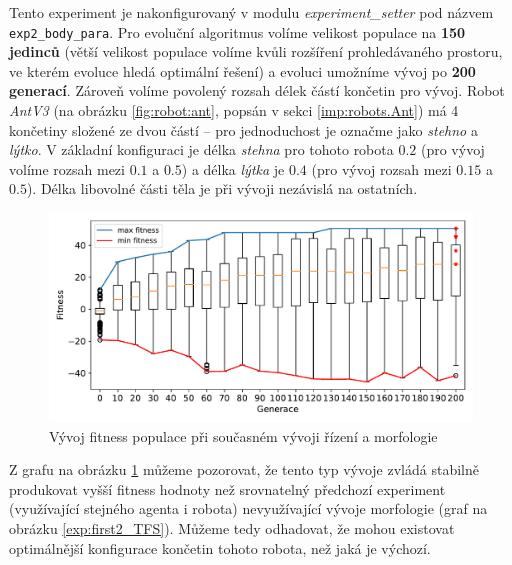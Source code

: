 Tento experiment je nakonfigurovaný v modulu \emph{experiment\_setter} pod
názvem \texttt{exp2\_body\_para}. Pro evoluční algoritmus volíme velikost
populace na \textbf{150 jedinců} (větší velikost populace volíme kvůli
rozšíření prohledávaného prostoru, ve kterém evoluce hledá optimální řešení) a
evoluci umožníme vývoj po \textbf{200 generací}. Zároveň volíme povolený rozsah
délek částí končetin pro vývoj. Robot \emph{AntV3} (na obrázku
\ref{fig:robot:ant}, popsán v sekci \ref{imp:robots.Ant}) má 4 končetiny
složené ze dvou částí -- pro jednoduchost je označme jako \emph{stehno} a
\emph{lýtko}. V základní konfiguraci je délka \emph{stehna} pro tohoto robota
$0.2$ (pro vývoj volíme rozsah mezi $0.1$ a $0.5$) a délka \emph{lýtka} je
$0.4$ (pro vývoj rozsah mezi $0.15$ a $0.5$). Délka libovolné části těla je při
vývoji nezávislá na ostatních.

\begin{figure}[h!]
    \includegraphics[width=1\textwidth]{../img/experiment2_para_10ticks.pdf}
    \caption{Vývoj fitness populace při současném vývoji řízení a morfologie}
    \label{exp:exp2_para}
\end{figure}

Z grafu na obrázku \ref{exp:exp2_para} můžeme pozorovat, že tento typ vývoje
zvládá stabilně produkovat vyšší fitness hodnoty než srovnatelný předchozí
experiment (využívající stejného agenta i robota) nevyužívající vývoje
morfologie (graf na obrázku \ref{exp:first2_TFS}). Můžeme tedy odhadovat, že
mohou existovat optimálnější konfigurace končetin tohoto robota, než jaká je
výchozí.

